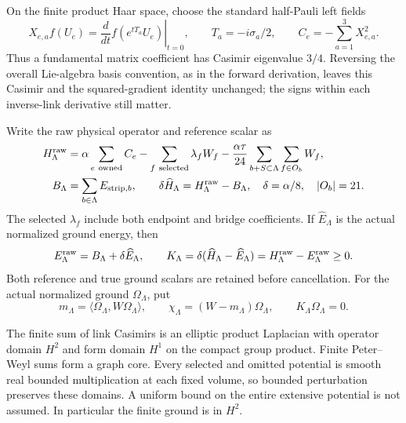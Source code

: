 On the finite product Haar space, choose the standard half-Pauli left fields
\begin{equation}
 X_{e,a}f(U_e)=\left.\frac d{dt}f(e^{tT_a}U_e)\right|_{t=0},
 \qquad T_a=-i\sigma_a/2,\qquad C_e=-\sum_{a=1}^3X_{e,a}^2.
 \label{eq:ak2-casimir}
\end{equation}
Thus a fundamental matrix coefficient has Casimir eigenvalue $3/4$. Reversing the overall Lie-algebra basis convention, as in the forward derivation, leaves this Casimir and the squared-gradient identity unchanged; the signs within each inverse-link derivative still matter.

Write the raw physical operator and reference scalar as
\begin{align}
 H^{\rm raw}_\Lambda
 &=\alpha\sum_{e\ {\rm owned}}C_e
 -\sum_{f\ {\rm selected}}\lambda_f W_f
 -\frac{\alpha\tau}{24}\sum_{b+S\subset\Lambda}\sum_{f\in O_b}W_f,\\
 B_\Lambda&=\sum_{b\in\Lambda}E_{{\rm strip},b},\qquad
 \delta\widehat H_\Lambda=H^{\rm raw}_\Lambda-B_\Lambda,
 \quad\delta=\alpha/8,\quad |O_b|=21.
 \label{eq:ak2-raw}
\end{align}
The selected $\lambda_f$ include both endpoint and bridge coefficients. If $\widehat E_\Lambda$ is the actual normalized ground energy, then
\begin{equation}
 E^{\rm raw}_\Lambda=B_\Lambda+\delta\widehat E_\Lambda,
 \qquad K_\Lambda=\delta(\widehat H_\Lambda-\widehat E_\Lambda)
 =H^{\rm raw}_\Lambda-E^{\rm raw}_\Lambda\ge0.
 \label{eq:ak2-centering}
\end{equation}
Both reference and true ground scalars are retained before cancellation. For the actual normalized ground $\Omega_\Lambda$, put
\begin{equation}
 m_\Lambda=\langle\Omega_\Lambda,W\Omega_\Lambda\rangle,
 \qquad\chi_\Lambda=(W-m_\Lambda)\Omega_\Lambda,
 \qquad K_\Lambda\Omega_\Lambda=0.
\end{equation}

The finite sum of link Casimirs is an elliptic product Laplacian with operator domain $H^2$ and form domain $H^1$ on the compact group product. Finite Peter--Weyl sums form a graph core. Every selected and omitted potential is smooth real bounded multiplication at each fixed volume, so bounded perturbation preserves these domains. A uniform bound on the entire extensive potential is not assumed. In particular the finite ground is in $H^2$.

